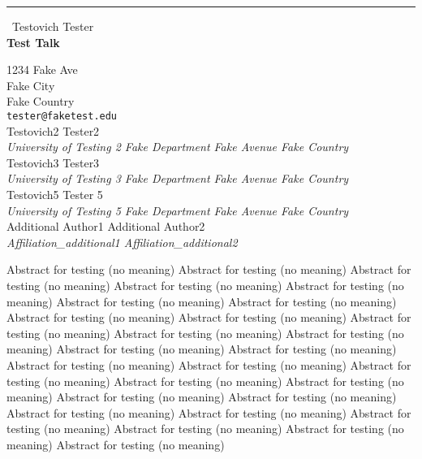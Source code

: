 \documentclass{report}
\begin{document}
\begin{center}
\rule{6in}{1pt} \
{\large Testovich Tester \\
{\bf Test Talk}}

1234 Fake Ave \\ Fake City \\ Fake Country
\\
{\tt tester@faketest.edu}\\
Testovich2 Tester2\\
{\em University of Testing 2
Fake Department
Fake Avenue
Fake Country}\\
Testovich3 Tester3\\
{\em University of Testing 3
Fake Department
Fake Avenue
Fake Country}\\
Testovich5 Tester 5\\
{\em University of Testing 5
Fake Department
Fake Avenue
Fake Country}\\
	Additional Author1
	Additional Author2\\
{\em Affiliation_additional1
Affiliation_additional2 }\end{center}

Abstract for testing (no meaning)
Abstract for testing (no meaning)
Abstract for testing (no meaning)
Abstract for testing (no meaning)
Abstract for testing (no meaning)
Abstract for testing (no meaning)
Abstract for testing (no meaning)
Abstract for testing (no meaning)
Abstract for testing (no meaning)
Abstract for testing (no meaning)
Abstract for testing (no meaning)
Abstract for testing (no meaning)
Abstract for testing (no meaning)
Abstract for testing (no meaning)
Abstract for testing (no meaning)
Abstract for testing (no meaning)
Abstract for testing (no meaning)
Abstract for testing (no meaning)
Abstract for testing (no meaning)
Abstract for testing (no meaning)
Abstract for testing (no meaning)
Abstract for testing (no meaning)
Abstract for testing (no meaning)
Abstract for testing (no meaning)
Abstract for testing (no meaning)
Abstract for testing (no meaning)
Abstract for testing (no meaning)
\end{document}
